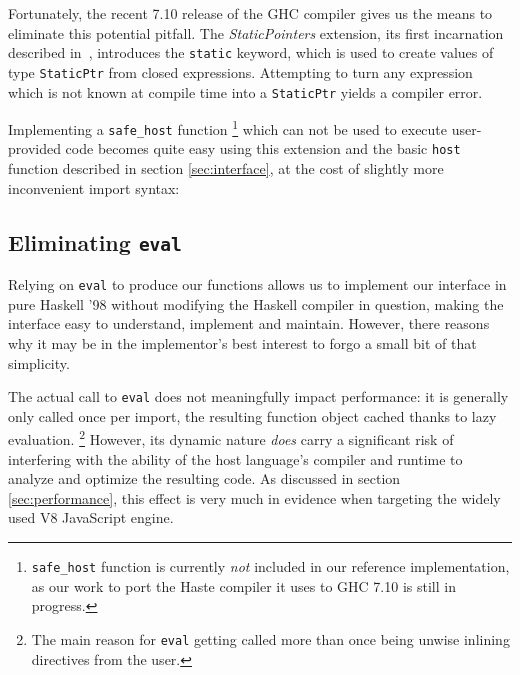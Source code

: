 \documentclass{sigplanconf}
\begin{document}
Fortunately, the recent 7.10 release of the GHC compiler gives us the means to
eliminate this potential pitfall. The \emph{StaticPointers} extension, its
first incarnation described in\ \cite{cloudhaskell}, introduces the
\lstinline!static! keyword, which is used to create values of type
\lstinline!StaticPtr! from closed expressions. Attempting to turn any
expression which is not known at compile time into a \lstinline!StaticPtr!
yields a compiler error.

Implementing a \lstinline!safe_host! function
\footnote{
  \lstinline!safe_host! function is currently \emph{not} included in our
  reference implementation, as our work to port the Haste compiler it uses to
  GHC 7.10 is still in progress.
}
which can not be used to execute user-provided code becomes quite easy using
this extension and the basic \lstinline!host! function described in section
\ref{sec:interface}, at the cost of slightly more inconvenient import syntax:


\subsection{Eliminating \lstinline!eval!}
\label{sec:inline-eval}
Relying on \lstinline!eval! to produce our functions allows us to
implement our interface in pure Haskell '98 without modifying the Haskell
compiler in question, making the interface easy to understand, implement and
maintain. However, there reasons why it may be in the implementor's best
interest to forgo a small bit of that simplicity.

The actual call to \lstinline!eval! does not meaningfully impact
performance: it is generally only called once per import,
the resulting function object cached thanks to lazy evaluation.
\footnote{The main reason for \lstinline!eval! getting called more than once
being unwise inlining directives from the user.}
However, its dynamic nature \emph{does}
carry a significant risk of interfering with the ability of the host language's
compiler and runtime to analyze and optimize the resulting code.
As discussed in section \ref{sec:performance}, this effect is very much in
evidence when targeting the widely used V8 JavaScript engine.
\end{document}

